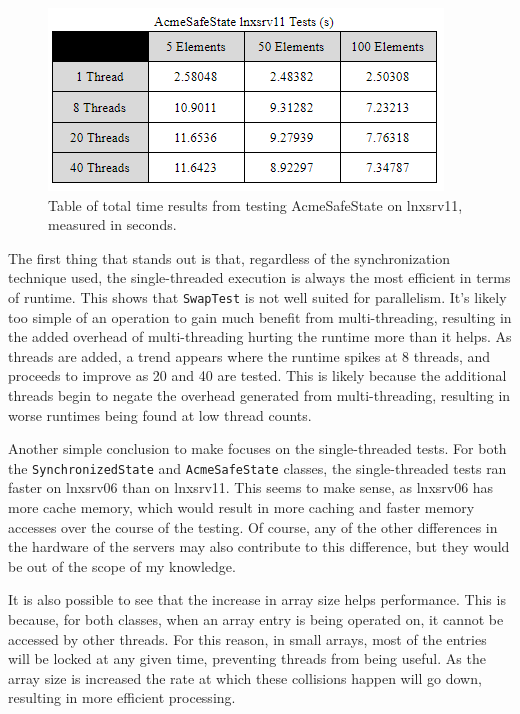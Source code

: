 \begin{figure}
  \includegraphics[scale=0.8]{./Assets/acmesafe-11.png}
  \caption{\label{fig:vectors} Table of total time results from testing AcmeSafeState on lnxsrv11, measured in seconds. }
\end{figure}

\par The first thing that stands out is that, regardless of the synchronization
technique used, the single-threaded execution is always the most efficient in
terms of runtime. This shows that \texttt{SwapTest} is not well suited for
parallelism. It's likely too simple of an operation to gain much benefit from
multi-threading, resulting in the added overhead of multi-threading hurting the
runtime more than it helps. As threads are added, a trend appears where the runtime
spikes at 8 threads, and proceeds to improve as 20 and 40 are tested. This is likely
because the additional threads begin to negate the overhead generated from multi-threading,
resulting in worse runtimes being found at low thread counts. 
\par Another simple conclusion to make focuses on the single-threaded tests.
For both the \texttt{SynchronizedState} and \texttt{AcmeSafeState} classes,
the single-threaded tests ran faster on lnxsrv06 than on lnxsrv11. This seems
to make sense, as lnxsrv06 has more cache memory, which would result in more caching and faster
memory accesses over the course of the testing. Of course, any of the other
differences in the hardware of the servers may also contribute to this difference,
but they would be out of the scope of my knowledge.
\par It is also possible to see that the increase in array size helps performance. This is
because, for both classes, when an array entry is being operated on, it cannot be accessed
by other threads. For this reason, in small arrays, most of the entries will be locked
at any given time, preventing threads from being useful. As the array size is increased
the rate at which these collisions happen will go down, resulting in more efficient processing.
